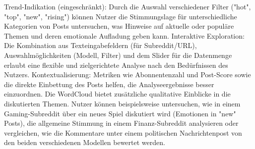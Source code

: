 Trend-Indikation (eingeschränkt): Durch die Auswahl verschiedener Filter ("hot", "top", "new", "rising") können Nutzer die Stimmungslage für unterschiedliche Kategorien von Posts untersuchen, was Hinweise auf aktuelle oder populäre Themen und deren emotionale Aufladung geben kann.
Interaktive Exploration: Die Kombination aus Texteingabefeldern (für Subreddit/URL), Auswahlmöglichkeiten (Modell, Filter) und dem Slider für die Datenmenge erlaubt eine flexible und zielgerichtete Analyse nach den Bedürfnissen des Nutzers.
Kontextualisierung: Metriken wie Abonnentenzahl und Post-Score sowie die direkte Einbettung des Posts helfen, die Analyseergebnisse besser einzuordnen. Die WordCloud bietet zusätzliche qualitative Einblicke in die diskutierten Themen.
Nutzer können beispielsweise untersuchen, wie in einem Gaming-Subreddit über ein neues Spiel diskutiert wird (Emotionen in "new" Posts), die allgemeine Stimmung in einem Finanz-Subreddit analysieren oder vergleichen, wie die Kommentare unter einem politischen Nachrichtenpost von den beiden verschiedenen Modellen bewertet werden.